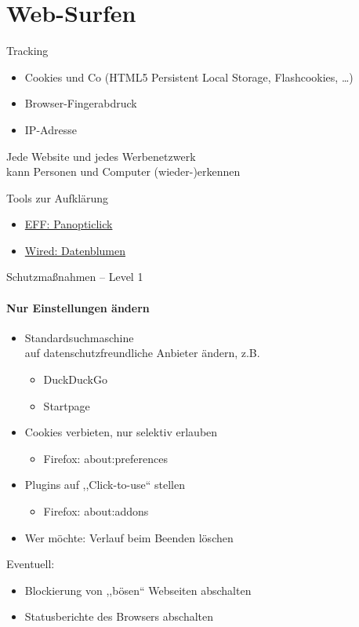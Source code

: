 \section{Web-Surfen}
\begin{frame}{Tracking}
  \begin{itemize}
    \item Cookies und Co (HTML5 Persistent Local Storage, Flashcookies, \ldots)
    \item Browser-Fingerabdruck
    \item IP-Adresse
  \end{itemize}
  Jede Website und jedes Werbenetzwerk\\kann Personen und Computer (wieder-)erkennen

  \begin{block}{Tools zur Aufklärung}
  \begin{itemize}
    \item \href{https://panopticlick.eff.org/}{EFF: Panopticlick}
    \item \href{http://datenblumen.wired.de/}{Wired: Datenblumen}
  \end{itemize}
  \end{block}
\end{frame}

\begin{frame}{Schutzmaßnahmen -- Level 1}
\framesubtitle{Nur Einstellungen ändern}
  \begin{itemize}
    \item Standardsuchmaschine\\ auf datenschutzfreundliche Anbieter ändern, z.B.
    \begin{itemize}
      \item DuckDuckGo
      \item Startpage
    \end{itemize}
    \item Cookies verbieten, nur selektiv erlauben
    \begin{itemize}
      \item Firefox: about:preferences
    \end{itemize}
    \item Plugins auf ,,Click-to-use`` stellen
    \begin{itemize}
      \item Firefox: about:addons
    \end{itemize}
    \item Wer möchte: Verlauf beim Beenden löschen
  \end{itemize}

  Eventuell:
  \begin{itemize}
    \item Blockierung von ,,bösen`` Webseiten abschalten
    \item Statusberichte des Browsers abschalten
  \end{itemize}
\end{frame}

